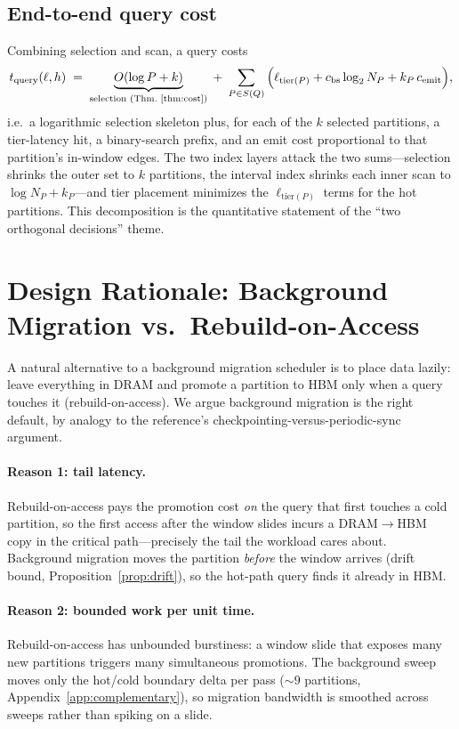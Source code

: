 \documentclass[10pt]{article}
\theoremstyle{definition}
\begin{document}
\subsection{End-to-end query cost}

Combining selection and scan, a query costs
\[
  t_{\mathrm{query}}(\ell,h) \;=\; \underbrace{O(\log P + k)}_{\text{selection (Thm.\ \ref{thm:cost})}}
   \;+\; \sum_{P\in S(Q)} \Big( \ell_{\mathrm{tier}(P)} + c_{\mathrm{bs}}\log_2 N_P + k_P\,c_{\mathrm{emit}} \Big),
\]
i.e.\ a logarithmic selection skeleton plus, for each of the $k$ selected partitions, a tier-latency hit, a
binary-search prefix, and an emit cost proportional to that partition's in-window edges. The two index layers
attack the two sums---selection shrinks the outer set to $k$ partitions, the interval index shrinks each
inner scan to $\log N_P + k_P$---and tier placement minimizes the $\ell_{\mathrm{tier}(P)}$ terms for the hot
partitions. This decomposition is the quantitative statement of the ``two orthogonal decisions'' theme.

\section{Design Rationale: Background Migration vs.\ Rebuild-on-Access}
\label{app:rationale}

A natural alternative to a background migration scheduler is to place data lazily: leave everything in DRAM
and promote a partition to HBM only when a query touches it (rebuild-on-access). We argue background migration
is the right default, by analogy to the reference's checkpointing-versus-periodic-sync argument.

\paragraph{Reason 1: tail latency.}
Rebuild-on-access pays the promotion cost \emph{on} the query that first touches a cold partition, so the
first access after the window slides incurs a DRAM$\to$HBM copy in the critical path---precisely the tail the
workload cares about. Background migration moves the partition \emph{before} the window arrives (drift bound,
Proposition~\ref{prop:drift}), so the hot-path query finds it already in HBM.

\paragraph{Reason 2: bounded work per unit time.}
Rebuild-on-access has unbounded burstiness: a window slide that exposes many new partitions triggers many
simultaneous promotions. The background sweep moves only the hot/cold boundary delta per pass (${\sim}9$
partitions, Appendix~\ref{app:complementary}), so migration bandwidth is smoothed across sweeps rather than
spiking on a slide.
\end{document}
